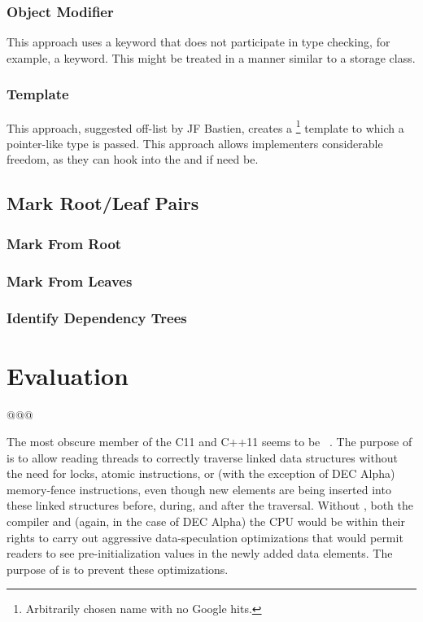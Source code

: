 \documentclass[letterpaper,twocolumn,10pt]{article}
\begin{document}
\subsubsection{Object Modifier}
\label{sec:Object Modifier}

This approach uses a keyword that does not participate in type checking,
for example, a  keyword.
This might be treated in a manner similar to a storage class.

\subsubsection{Template}
\label{sec:Template}

This approach, suggested off-list by JF Bastien, creates a
\footnote{
	Arbitrarily chosen name with no Google hits.}
template to which a pointer-like type is passed.
This approach allows implementers considerable freedom, as they can
hook into the \co{->} and \co{*} if need be.

\subsection{Mark Root/Leaf Pairs}
\label{sec:Mark Root/Leaf Pairs}

\subsubsection{Mark From Root}
\label{sec:Mark From Root}

\subsubsection{Mark From Leaves}
\label{sec:Mark From Leaves}

\subsubsection{Identify Dependency Trees}
\label{sec:Identify Dependency Trees}

\section{Evaluation}
\label{sec:Evaluation}

@@@

The most obscure member of the C11 and C++11  
seems to be
~\cite{RichardSmith2015N4527}.
The purpose of  is to allow reading threads
to correctly traverse linked data structures without the need for locks,
atomic instructions, or (with the exception of DEC Alpha) memory-fence
instructions, even though new elements are being inserted into these
linked structures before, during, and after the traversal.
Without , both the compiler and (again, in the case
of DEC Alpha) the CPU would be within their rights to carry out aggressive
data-speculation optimizations that would permit readers to see
pre-initialization values in the newly added data elements.
The purpose of  is to prevent these optimizations.
\end{document}
